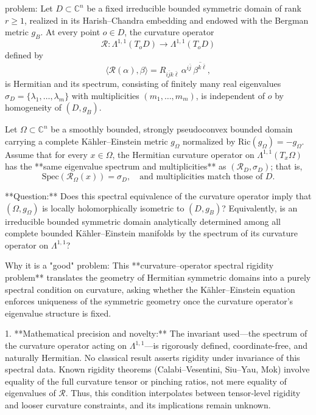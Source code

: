 problem:  
Let \( D \subset \mathbb{C}^n \) be a fixed irreducible bounded symmetric domain of rank \( r \ge 1 \), realized in its Harish–Chandra embedding and endowed with the Bergman metric \( g_B \).  At every point \( o \in D \), the curvature operator  
\[
\mathcal{R} : \Lambda^{1,1}(T_o D) \to \Lambda^{1,1}(T_o D)
\]
defined by  
\[
\langle \mathcal{R}(\alpha), \beta \rangle = R_{i\bar j k \bar \ell}\, \alpha^{i\bar j}\, \overline{\beta^{k\bar \ell}},
\]
is Hermitian and its spectrum, consisting of finitely many real eigenvalues \( \sigma_D = \{ \lambda_1, \dots, \lambda_m \} \) with multiplicities \( (m_1,\dots,m_m) \), is independent of \(o\) by homogeneity of \( (D,g_B) \).

Let \( \Omega \subset \mathbb{C}^n \) be a smoothly bounded, strongly pseudoconvex bounded domain carrying a complete Kähler–Einstein metric \( g_\Omega \) normalized by \( \mathrm{Ric}(g_\Omega) = -g_\Omega \).  
Assume that for every \( x \in \Omega \), the Hermitian curvature operator on \( \Lambda^{1,1}(T_x \Omega) \) has the **same eigenvalue spectrum and multiplicities** as \( (\mathcal{R}_D,\sigma_D) \); that is,  
\[
\mathrm{Spec}(\mathcal{R}_\Omega(x)) = \sigma_D, \quad  \text{and multiplicities match those of } D.
\]

**Question:**  
Does this spectral equivalence of the curvature operator imply that \( (\Omega,g_\Omega) \) is locally holomorphically isometric to \( (D,g_B) \)?  
Equivalently, is an irreducible bounded symmetric domain analytically determined among all complete bounded Kähler–Einstein manifolds by the spectrum of its curvature operator on \( \Lambda^{1,1} \)?

Why it is a "good" problem:  
This **curvature–operator spectral rigidity problem** translates the geometry of Hermitian symmetric domains into a purely spectral condition on curvature, asking whether the Kähler–Einstein equation enforces uniqueness of the symmetric geometry once the curvature operator’s eigenvalue structure is fixed.  

1. **Mathematical precision and novelty:**  
   The invariant used—the spectrum of the curvature operator acting on \( \Lambda^{1,1} \)—is rigorously defined, coordinate-free, and naturally Hermitian.  No classical result asserts rigidity under invariance of this spectral data.  Known rigidity theorems (Calabi–Vesentini, Siu–Yau, Mok) involve equality of the full curvature tensor or pinching ratios, not mere equality of eigenvalues of \( \mathcal{R} \).  Thus, this condition interpolates between tensor‑level rigidity and looser curvature constraints, and its implications remain unknown.

